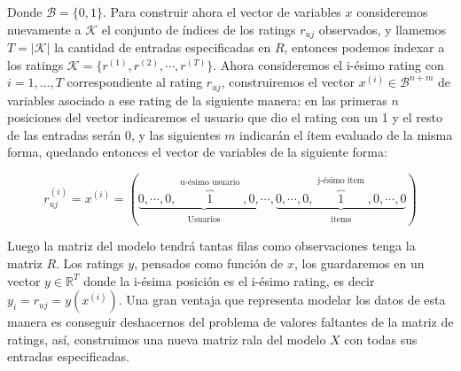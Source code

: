 \documentclass[hidelinks,12pt,a4paper]{book}
\theoremstyle{plain}
\theoremstyle{definition}
\begin{document}
Donde $\mathcal{B}=\{0,1\}$. Para construir ahora el vector de variables $x$ consideremos nuevamente a $\mathcal{K}$ el conjunto de índices de los ratings $r_{uj}$ observados, y llamemos $T=|\mathcal{K}|$ la cantidad de entradas especificadas en $R$, entonces podemos indexar a los ratings $\mathcal{K}=\{r^{(1)},r^{(2)},\cdots,r^{(T)}\}$. Ahora consideremos el i-ésimo rating con $i=1,\ldots,T$ correspondiente al rating $r_{uj}$, construiremos el vector $x^{(i)} \in \mathcal{B}^{n+m}$ de variables asociado a ese rating de la siguiente manera: en las primeras $n$ posiciones del vector indicaremos el usuario que dio el rating con un 1 y el resto de las entradas serán 0, y las siguientes $m$ indicarán el ítem evaluado de la misma forma, quedando entonces el vector de variables de la siguiente forma:

\begin{equation}
r_{uj}^{(i)} = x^{(i)} = ( \underbrace{0,\cdots,0,\overbrace{1}^{\substack{\text{u-ésimo usuario}}},0,\cdots}_{\substack{\text{Usuarios}}}, \underbrace{0,\cdots,0,\overbrace{1}^{\substack{\text{j-ésimo ítem}}},0,\cdots,0}_{\substack{\text{items}}} )
\end{equation}

Luego la matriz del modelo tendrá tantas filas como observaciones tenga la matriz $R$. Los ratings $y$, pensados como función de $x$, los guardaremos en un vector $y \in \mathbb{R}^T$ donde la i-ésima posición es el i-ésimo rating, es decir $y_i=r_{uj}=y(x^{(i)})$. Una gran ventaja que representa modelar los datos de esta manera es conseguir deshacernos del problema de valores faltantes de la matriz de ratings, así, construimos una nueva matriz rala del modelo $X$ con todas sus entradas especificadas.
\end{document}
